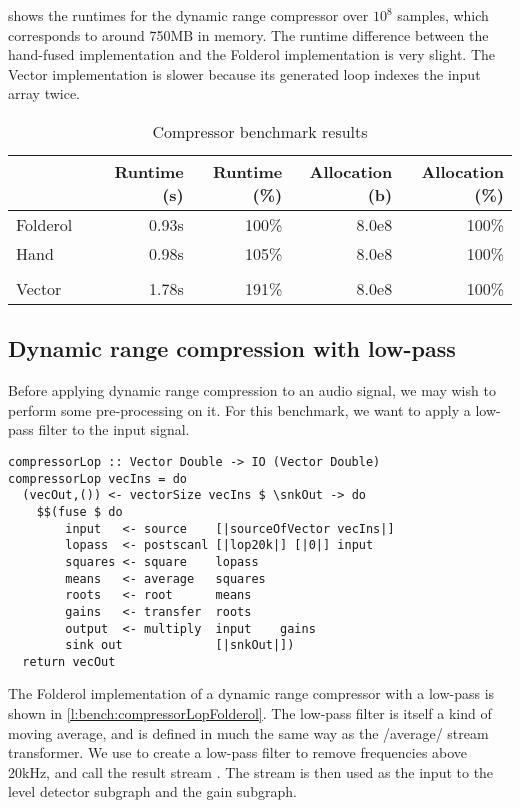  shows the runtimes for the dynamic range compressor over $10^8$ samples, which corresponds to around 750MB in memory.
The runtime difference between the hand-fused implementation and the Folderol implementation is very slight. 
The Vector implementation is slower because its generated loop indexes the input array twice.

\begin{table}
\begin{center}
\begin{tabular}{ll|rrrr}
& & Runtime (s)  & Runtime (\%) & Allocation (b) & Allocation (\%) \\
\hline
Folderol &          & 0.93s &   100\% & 8.0e8 & 100\% \\
Hand     &          & 0.98s &   105\% & 8.0e8 & 100\% \\
&&&\\
Vector &            & 1.78s &   191\% & 8.0e8 & 100\%\\
\end{tabular}
\end{center}
\caption[Compressor benchmark results]{Compressor benchmark results}
\label{table:bench:compressor}
\end{table}

\subsection{Dynamic range compression with low-pass}
Before applying dynamic range compression to an audio signal, we may wish to perform some pre-processing on it.
For this benchmark, we want to apply a low-pass filter to the input signal.

\begin{lstlisting}[float,label=l:bench:compressorLopFolderol,caption=Folderol implementation of \Hs/compressor/ with low-pass]
compressorLop :: Vector Double -> IO (Vector Double)
compressorLop vecIns = do
  (vecOut,()) <- vectorSize vecIns $ \snkOut -> do
    $$(fuse $ do
        input   <- source    [|sourceOfVector vecIns|]
        lopass  <- postscanl [|lop20k|] [|0|] input
        squares <- square    lopass
        means   <- average   squares
        roots   <- root      means
        gains   <- transfer  roots
        output  <- multiply  input    gains
        sink out             [|snkOut|])
  return vecOut
\end{lstlisting}

The Folderol implementation of a dynamic range compressor with a low-pass is shown in \cref{l:bench:compressorLopFolderol}.
The low-pass filter is itself a kind of moving average, and is defined in much the same way as the \Hs/average/ stream transformer.
We use \Hs@postscanl@ to create a low-pass filter to remove frequencies above 20kHz, and call the result stream \Hs@lopass@.
The \Hs@lopass@ stream is then used as the input to the level detector subgraph and the gain subgraph.


